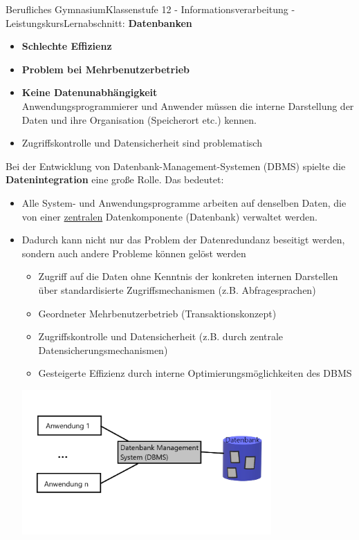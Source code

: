 \documentclass[11pt,oneside,openany,headings=optiontotoc,11pt,numbers=noenddot]{article}
\begin{document}
\begin{worksheet}{Berufliches Gymnasium}{Klassenstufe 12 - Informationsverarbeitung - Leistungskurs}{Lernabschnitt: \textbf{Datenbanken}}
\begin{itemize}[label=-]
			Die gleichen Daten werden von mehreren verschiedenen Dateien gespeichert, z.B. Adressen von Kunden werden von mehreren Anwendungen wie Auftragsabwicklung, Buchhaltung usw. verwaltet.\\
			\textit{Problem:} Speicherplatzverschwendung, Inkonsistenzen
			\item \textbf{Schlechte Effizienz}
			\item \textbf{Problem bei Mehrbenutzerbetrieb}
			\item \textbf{Keine Datenunabhängigkeit}\\
			Anwendungsprogrammierer und Anwender müssen die interne Darstellung der Daten und ihre Organisation (Speicherort etc.) kennen.
			\item Zugriffskontrolle und Datensicherheit sind problematisch
		\end{itemize}
		Bei der Entwicklung von Datenbank-Management-Systemen (DBMS) spielte die \textbf{Datenintegration} eine große Rolle. Das bedeutet:
		\begin{itemize}[label=-]
			\item Alle System- und Anwendungsprogramme arbeiten auf denselben Daten, die von einer \underline{zentralen} Datenkomponente (\grqq{}Datenbank\grqq{}) verwaltet werden.
			\item Dadurch kann nicht nur das Problem der Datenredundanz beseitigt werden, sondern auch andere Probleme können gelöst werden
			\begin{itemize}
				\item Zugriff auf die Daten ohne Kenntnis der konkreten internen Darstellen über standardisierte Zugriffsmechanismen (z.B. Abfragesprachen)
				\item \glqq{}Geordneter\grqq{} Mehrbenutzerbetrieb (Transaktionskonzept)
				\item Zugriffskontrolle und Datensicherheit (z.B. durch zentrale Datensicherungsmechanismen)
				\item Gesteigerte Effizienz durch interne Optimierungsmöglichkeiten des DBMS
			\end{itemize}
			\begin{center}
				\includegraphics[width=0.75\textwidth]{../99_Bilder/DBMS.png}
			\end{center}
		\end{itemize}

\end{worksheet}
\end{document}
